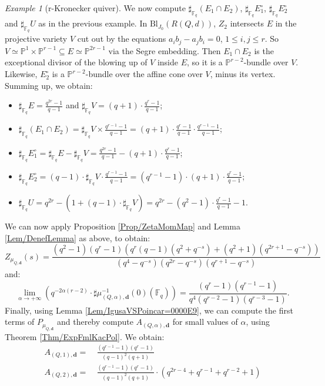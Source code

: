 \documentclass[11pt,english]{article}
\numberwithin{equation}{section}
\numberwithin{figure}{section}
\theoremstyle{definition}
\theoremstyle{plain}
\theoremstyle{remark}
\newtheorem{exmp}[df]{Example}
\newcommand\dd{\mathbf{d}}
\newcommand\FF{\mathbb{F}}
\begin{document}
\begin{exmp}[r-Kronecker quiver]
We now compute $\sharp_{\FF_{q}}(E_{1}\cap E_{2})$, $\sharp_{\FF_{q}}E_{1}^{\circ}$,
$\sharp_{\FF_{q}}E_{2}^{\circ}$ and $\sharp_{\FF_{q}}U$ as in the
previous example. In $\mathrm{Bl}_{J_{0}}(R(Q,d))$, $Z_{2}$ intersects
$E$ in the projective variety $V$ cut out by the equations $a_{i}b_{j}-a_{j}b_{i}=0$,
$1\leq i,j\leq r$. So $V\simeq\mathbb{P}^{1}\times\mathbb{P}^{r-1}\subseteq E\simeq\mathbb{P}^{2r-1}$
via the Segre embedding. Then $E_{1}\cap E_{2}$ is the exceptional
divisor of the blowing up of $V$ inside $E$, so it is a $\mathbb{P}^{r-2}$-bundle
over $V$. Likewise, $E_{2}^{\circ}$ is a $\mathbb{P}^{r-2}$-bundle
over the affine cone over $V$, minus its vertex. Summing up, we obtain:
\begin{itemize}
\item $\sharp_{\FF_{q}}E=\frac{q^{2r}-1}{q-1}$ and $\sharp_{\FF_{q}}V=(q+1)\cdot\frac{q^{r}-1}{q-1}$;
\item $\sharp_{\FF_{q}}(E_{1}\cap E_{2})=\sharp_{\FF_{q}}V\times\frac{q^{r-1}-1}{q-1}=(q+1)\cdot\frac{q^{r}-1}{q-1}\cdot\frac{q^{r-1}-1}{q-1}$;
\item $\sharp_{\FF_{q}}E_{1}^{\circ}=\sharp_{\FF_{q}}E-\sharp_{\FF_{q}}V=\frac{q^{2r}-1}{q-1}-(q+1)\cdot\frac{q^{r}-1}{q-1}$;
\item $\sharp_{\FF_{q}}E_{2}^{\circ}=(q-1)\cdot\sharp_{\FF_{q}}V\cdot\frac{q^{r-1}-1}{q-1}=(q^{r-1}-1)\cdot(q+1)\cdot\frac{q^{r}-1}{q-1}$;
\item $\sharp_{\FF_{q}}U=q^{2r}-(1+(q-1)\cdot\sharp_{\FF_{q}}V)=q^{2r}-(q^{2}-1)\cdot\frac{q^{r}-1}{q-1}-1$.
\end{itemize}
We can now apply Proposition \ref{Prop/ZetaMomMap} and Lemma \ref{Lem/DenefLemma}
as above, to obtain:\[
Z_{\mu_{Q,\dd}}(s)
=
\frac{(q^2-1)(q^{r}-1)(q^{r}(q-1)(q^{2}+q^{-s})+(q^{2}+1)(q^{2r+1}-q^{-s}))}{(q^{4}-q^{-s})(q^{2r}-q^{-s})(q^{r+1}-q^{-s})}
\]and:\[
\underset{\alpha\rightarrow +\infty}{\lim}\left( q^{-2\alpha (r-2)}\cdot\sharp\mu_{(Q,\alpha),\dd}^{-1}(0)(\FF_q)\right)
=
\frac{(q^r-1)(q^{r-1}-1)}{q^4(q^{r-2}-1)(q^{r-3}-1)}.
\]Finally, using Lemma \ref{Lem/IgusaVSPoincar=0000E9}, we can compute
the first terms of $P_{\mu_{Q,\dd}}$ and thereby compute $A_{(Q,\alpha),\dd}$
for small values of $\alpha$, using Theorem \ref{Thm/ExpFmlKacPol}.
We obtain:\[
\begin{split}
A_{(Q,1),\dd} = & \  \frac{(q^{r-1}-1) (q^{r}-1)}{(q-1)^{2} (q+ 1)} \\
A_{(Q,2),\dd} = & \ \frac{(q^{r-1}-1) (q^{r}-1)}{(q-1)^{2} (q+ 1)}\cdot (q^{2r-4}+q^{r-1}+q^{r-2}+1) \\

\end{split}\]
\end{exmp}
\end{document}
